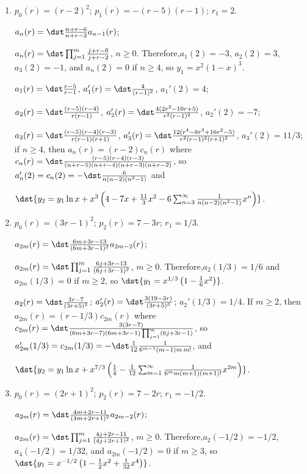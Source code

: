\documentclass[openany]{book}
\newenvironment{sectionSolutions}{
 \begin{enumerate}[item-label={\thesection.\arabic{enumi}.}]
}{
 \end{enumerate}
}
\begin{document}
\begin{sectionSolutions}
\item
$p_0(r)=(r-2)^2$;
$p_1(r)=-(r-5)(r-1)$;
$r_1=2$.


$a_n(r)=\dst \frac{n+r-6}{ n+r-2}
a_{n-1}(r)$;

 $a_n(r)=\dst\prod_{j=1}^m\frac{j+r-6}{ j+r-2}$,
$n\ge0$. Therefore,$a_1(2)=-3$, $a_2(2)=3$, $a_3(2)=-1$, and
$a_n(2)=0$ if $n\ge4$, so $y_1=x^2(1-x)^3$.


$a_1(r)=\dst\frac{r-5}{ r-1}$, $a_1'(r)=\dst\frac{4}{(r-1)^2}$,
$a_1'(2)=4$;

$a_2(r)=\dst\frac{(r-5)(r-4)}{ r(r-1)}$,
$a_2'(r)=\dst\frac{4(2r^2-10r+5)}{ r^2(r-1)^2}$,
$a_2'(2)=-7$;

$a_3(r)=\dst\frac{(r-5)(r-4)(r-3)}{ r(r-1)(r+1)}$,
$a_3'(r)=\dst\frac{12(r^4-8r^3+16r^2-5)}{ r^2(r-1)^2(r+1)^2}$,
$a_3'(2)=11/3$; if $n\ge4$, then
$a_n(r)=(r-2)c_n(r)$ where
$c_n(r)=\dst
\frac{(r-5)(r-4)(r-3)}{(n+r-5)(n+r-4)(n+r-3)(n+r-2)}$, so
$a_n'(2)=c_n(2)=-\dst\frac{6}{ n(n-2)(n^2-1)}$ and

$\dst{y_2=y_1\ln
x+x^3\left(4-7x+\frac{11}{3}x^2-6\sum_{n=3}^\infty\frac{1}{
n(n-2)(n^2-1)}x^n\right)}$.


\item
$p_0(r)=(3r-1)^2$;
$p_2(r)=7-3r$;
$r_1=1/3$.

$a_{2m}(r)=\dst\frac{6m+3r-13}{(6m+3r-1)^2}
a_{2m-2}(r)$;

 $a_{2m}(r)=\dst\prod_{j=1}^m\frac{6j+3r-13}{(6j+3r-1)^2}$,
$m\ge0$. Therefore,$a_2(1/3)=1/6$ and $a_{2m}(1/3)=0$ if $m\ge2$,
so $\dst{y_1=x^{1/3}\left(1-\frac{1}{6}x^2\right)}$.


$a_2(r)=\dst\frac{3r-7}{(3r+5)^2}$;
$a_2'(r)=\dst\frac{3(19-3r)}{(3r+5)^3}$; $a_2'(1/3)= 1/4$.
If $m\ge2$, then $a_{2m}(r)=(r-1/3)c_{2m}(r)$ where
$c_{2m}(r)=\dst\frac{3(3r-7)}{(6m+3r-7)(6m+3r-1)\prod_{j=1}^m(6j+3r-1)}$,
so
$a_{2m}'(1/3)=c_{2m}(1/3)=-\dst\frac{1}{12}\frac{1}{6^{m-1}(m-1)m\,m!}$,
and

 $\dst{y_2=y_1\ln x
+x^{7/3}\left(\frac{1}{4}-\frac{1}{12}\sum_{m=1}^\infty
\frac{1}{6^mm(m+1)(m+1)!}x^{2m}\right)}$.


\item
$p_0(r)=(2r+1)^2$;
$p_2(r)=7-2r$;
$r_1=-1/2$.

$a_{2m}(r)=\dst\frac{4m+2r-11}{(4m+2r+1)^2}
a_{2m-2}(r)$;

 $a_{2m}(r)=\dst\prod_{j=1}^m\frac{4j+2r-11}{(4j+2r+1)^2}$,
$m\ge0$. Therefore,$a_2(-1/2)=-1/2$, $a_4(-1/2)=1/32$, and
$a_{2m}(-1/2)=0$ if $m\ge3$, so
$\dst{y_1=x^{-1/2}\left(1-\frac{1}{2}x^2+\frac{1}{32}x^4\right)}$.




\end{sectionSolutions}
\end{document}
